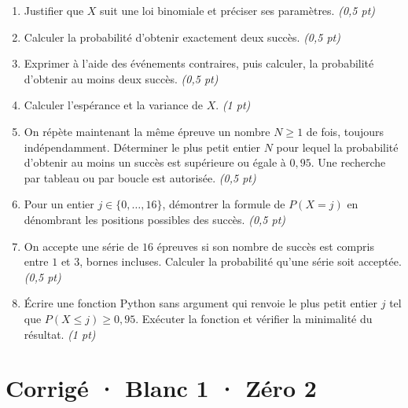\begin{enumerate}

\item Justifier que $X$ suit une loi binomiale et préciser ses paramètres. \hfill\textit{(0,5 pt)}

\item Calculer la probabilité d'obtenir exactement deux succès. \hfill\textit{(0,5 pt)}

\item Exprimer à l'aide des événements contraires, puis calculer, la probabilité d'obtenir au moins deux succès. \hfill\textit{(0,5 pt)}

\item Calculer l'espérance et la variance de $X$. \hfill\textit{(1 pt)}

\item On répète maintenant la même épreuve un nombre $N\ge1$ de fois, toujours indépendamment. Déterminer le plus petit entier $N$ pour lequel la probabilité d'obtenir au moins un succès est supérieure ou égale à $0{,}95$. Une recherche par tableau ou par boucle est autorisée. \hfill\textit{(0,5 pt)}

\item Pour un entier $j\in\{0,\ldots,16\}$, démontrer la formule de $P(X=j)$ en dénombrant les positions possibles des succès. \hfill\textit{(0,5 pt)}

\item On accepte une série de $16$ épreuves si son nombre de succès est compris entre $1$ et $3$, bornes incluses. Calculer la probabilité qu'une série soit acceptée. \hfill\textit{(0,5 pt)}

\item Écrire une fonction Python sans argument qui renvoie le plus petit entier $j$ tel que $P(X\le j)\ge0{,}95$. Exécuter la fonction et vérifier la minimalité du résultat. \hfill\textit{(1 pt)}

\end{enumerate}

\ifprof\clearpage

\section*{Corrigé · Blanc 1 · Zéro 2}\label{cor:5-2}

